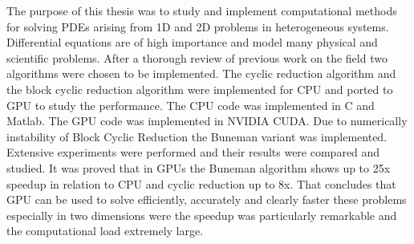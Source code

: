 
The purpose of this thesis was to study and implement computational methods for solving PDEs arising from 1D and 2D problems in heterogeneous systems. Differential equations are of high importance and model many physical and scientific problems. After a thorough review of previous work on the field two algorithms were chosen to be implemented. The cyclic reduction algorithm and the block cyclic reduction algorithm were implemented for CPU and ported to GPU to study the performance. The CPU code was implemented in C and Matlab. The GPU code was implemented in NVIDIA CUDA. Due to numerically instability of Block Cyclic Reduction the Buneman variant was implemented. Extensive experiments were performed and their results were compared and studied. It was proved that in GPUs the Buneman algorithm shows up to 25x speedup in relation to CPU and cyclic reduction up to 8x. That concludes that GPU can be used to solve efficiently, accurately and clearly faster these problems especially in two dimensions were the speedup was particularly remarkable and the computational load extremely large.